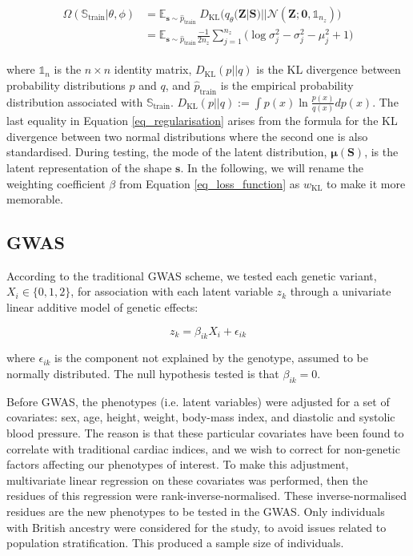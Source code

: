 \begin{align}
\begin{split}
\Omega(\mathbb{S}_\text{train}|\theta, \phi)&= \mathbb{E}_{\mathbf{s}\sim\hat{p}_{\text{train}}}\
D_{\text{KL}}\Big(q_{\theta}(\textbf{Z}|\textbf{S})||\mathcal{N}(\mathbf{Z};\mathbf{0}, \mathbb{1}_{n_z})\Big)\\
&=\mathbb{E}_{\mathbf{s}\sim\hat{p}_{\text{train}}}
\frac{-1}{2n_z}\sum_{j=1}^{n_z}\Big(\log\sigma^2_j-\sigma^2_j-\mu^2_j+1\Big)
\label{eq_regularisation}
\end{split}
\end{align}

\noindent where $\mathbb{1}_{n}$ is the $n\times n$ identity matrix, $D_{\text{KL}}(p||q)$ is the KL divergence between probability distributions $p$ and $q$, and $\hat{p}_{\text{train}}$ is the empirical probability distribution associated with $\mathbb{S}_\text{train}$.
$D_{\text{KL}}(p||q):=\int p(x)\ln{\frac{p(x)}{q(x)}}dp(x)$. The last equality in Equation \ref{eq_regularisation} arises
from the formula for the KL divergence between two normal distributions where the second one is also standardised. During testing, the mode of the latent distribution, $\pmb{\mu}(\textbf{S})$, is the latent representation of the shape $\textbf{s}$. In the following, we will rename the weighting coefficient $\beta$ from Equation \ref{eq_loss_function} as $w_{\text{KL}}$ to make it more memorable.

\subsection{GWAS}
According to the traditional GWAS scheme, we tested each genetic variant, $X_i\in\{0,1,2\}$, for association with each latent variable $z_k$ through a univariate linear additive model of genetic effects:

\begin{equation}
z_k = \beta_{ik}X_i+\epsilon_{ik}
\label{eq_gwas}
\end{equation}

\noindent where $\epsilon_{ik}$ is the component not explained by the genotype, assumed to be normally distributed. The null hypothesis tested is that $\beta_{ik}=0$. 

Before GWAS, the phenotypes (i.e. latent variables) were adjusted for a set of covariates: sex, age, height, weight, body-mass index, and diastolic and systolic blood pressure. The reason is that these particular covariates have been found to correlate with traditional cardiac indices, and we wish to correct for non-genetic factors affecting our phenotypes of interest. To make this adjustment, multivariate linear regression on these covariates was performed, then the residues of this regression were rank-inverse-normalised. These inverse-normalised residues are the new phenotypes to be tested in the GWAS. Only individuals with British ancestry were considered for the study, to avoid issues related to population stratification. This produced a sample size of \NCMRGBR individuals.

